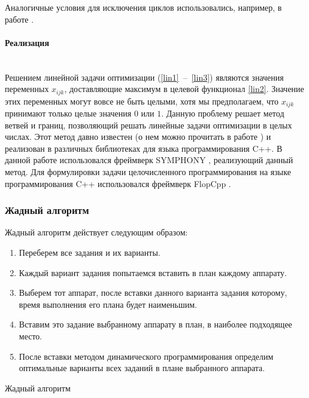 \documentclass[a4paper,14pt,russian]{article}
\begin{document}
Аналогичные условия для исключения циклов использовались, например, в работе \cite{shmoys1990analyzing}.

\paragraph{Реализация} ~\\
Решением линейной задачи оптимизации (\eqref{lin1}~--~\eqref{lin3}) являются значения переменных  $x_{i j k}$, доставляющие максимум в целевой функционал \eqref{lin2}.
Значение этих переменных могут вовсе не быть целыми, хотя мы предполагаем, что $x_{i j k}$ принимают только целые значения $0$ или $1$. Данную проблему решает метод ветвей и границ, позволяющий решать линейные задачи оптимизации в целых числах. Этот метод давно известен (о нем можно прочитать в работе \cite{lawler1966branch}) и реализован в различных библиотеках для языка программирования C++.
В данной работе использовался фреймверк SYMPHONY \cite{ralphs2005symphony}, реализующий данный метод.
Для формулировки задачи целочисленного программирования на языке программирования C++ использовался фреймверк FlopCpp \cite{hultberg2007flopc++}.

\subsubsection{Жадный алгоритм}
Жадный алгоритм действует следующим образом:
\begin{enumerate}
\item Переберем все задания и их варианты.
\item Каждый вариант задания попытаемся вставить в план каждому аппарату.
\item Выберем тот аппарат, после вставки данного варианта задания которому, время выполнения его плана будет наименьшим.
\item Вставим это задание выбранному аппарату в план, в наиболее подходящее место.
\item После вставки методом динамического программирования определим оптимальные варианты всех заданий в плане выбранного аппарата.
\end{enumerate}

\pagebreak

\begin{algorithm}
\caption{Жадный алгоритм}\label{alg:greedy}
\end{algorithm}
\end{document}

